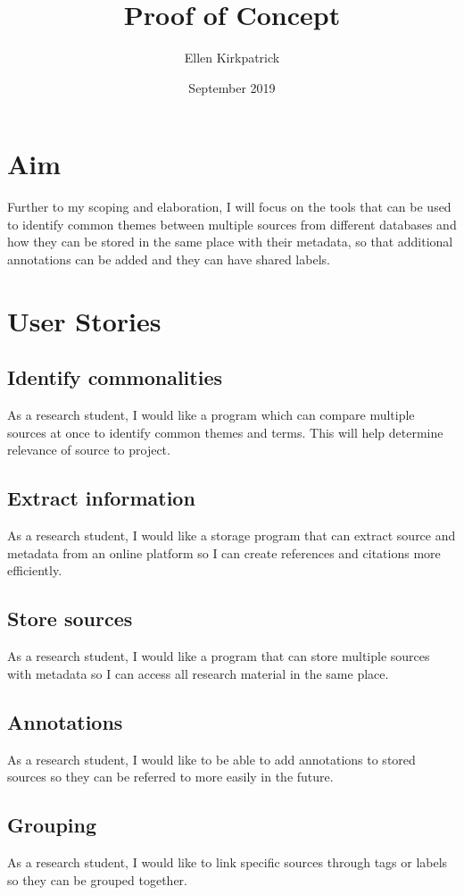 \documentclass{article}
\title{Proof of Concept}
\author{Ellen Kirkpatrick }
\date{September 2019}
\begin{document}
\maketitle

\section{Aim}
Further to my scoping and elaboration, I will focus on the tools that can be used to identify common themes between multiple sources from different databases and how they can be stored in the same place with their metadata, so that additional annotations can be added and they can have shared labels.

\section{User Stories}
\subsection{Identify commonalities}
As a research student, I would like a program which can compare multiple sources at once to identify common themes and terms. This will help determine relevance of source to project.
\subsection{Extract information}
As a research student, I would like a storage program that can extract source and metadata from an online platform so I can create references and citations more efficiently.
\subsection{Store sources}
As a research student, I would like a program that can store multiple sources with metadata so I can access all research material in the same place. 
\subsection{Annotations}
As a research student, I would like to be able to add annotations to stored sources so they can be referred to more easily in the future.
\subsection{Grouping}
As a research student, I would like to link specific sources through tags or labels so they can be grouped together. 
\end{document}
